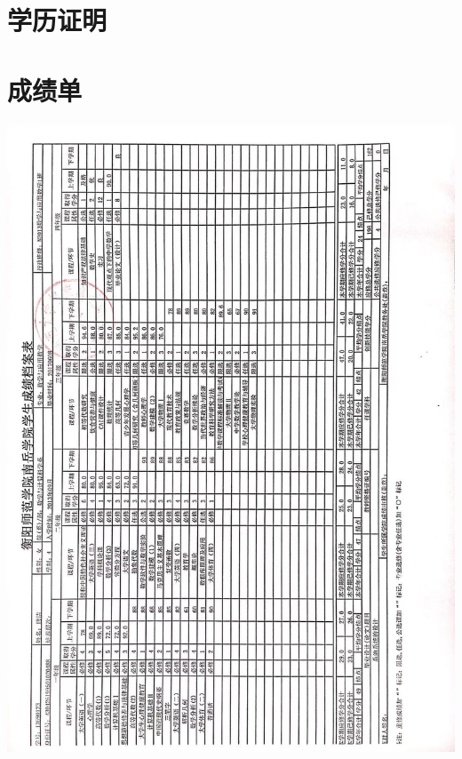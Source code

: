 \documentclass[UFT8]{ctexart}%
\begin{document}
\section{学历证明}





\clearpage
\section{成绩单}
\begin{center}

 \includegraphics[scale=0.28]{figs/本科成绩单.JPG }


\end{center}
\end{document}
